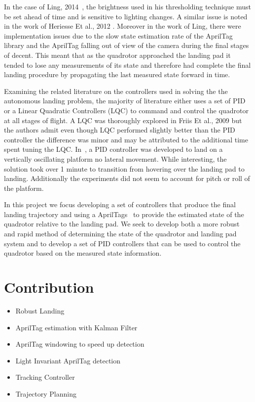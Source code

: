 \documentclass[letterpaper, 10 pt, conference]{ieeeconf}
\begin{document}
In the case of Ling, 2014~\cite{Kim2014}, the brightness used in his
thresholding technique must be set ahead of time and is sensitive to lighting
changes. A similar issue is noted in the work of Heriesse Et al., 2012
\cite{Herisse2012}. Moreover in the work of Ling, there were implementation
issues due to the slow state estimation rate of the AprilTag library and the
AprilTag falling out of view of the camera during the final stages of decent.
This meant that as the quadrotor approached the landing pad it tended to lose
any measurements of its state and therefore had complete the final landing
procedure by propagating the last measured state forward in time.

Examining the related literature on the controllers used in solving the the
autonomous landing problem, the majority of literature either uses a set of PID
or a Linear Quadratic Controllers (LQC) to command and control the quadrotor at
all stages of flight. A LQC was thoroughly explored in Friis Et al., 2009
\cite{Friis2009} but the authors admit even though LQC performed slightly
better than the PID controller the difference was minor and may be attributed
to the additional time spent tuning the LQC\@. In~\cite{Herisse2012}, a PID
controller was developed to land on a vertically oscillating platform no
lateral movement. While interesting, the solution took over 1 minute to
transition from hovering over the landing pad to landing. Additionally the
experiments did not seem to account for pitch or roll of the platform.

In this project we focus developing a set of controllers that produce the final
landing trajectory and using a  AprilTags~\cite{apriltags} to provide the
estimated state of the quadrotor relative to the landing pad. We seek to
develop both a more robust and rapid method of determining the state of the
quadrotor and landing pad system and to develop a set of PID controllers that
can be used to control the quadrotor based on the measured state information.


\section{Contribution}

\begin{itemize}
  \item{Robust Landing}
  \item{AprilTag estimation with Kalman Filter}
  \item{AprilTag windowing to speed up detection}
  \item{Light Invariant AprilTag detection}
  \item{Tracking Controller}
  \item{Trajectory Planning}
\end{itemize}
\end{document}
